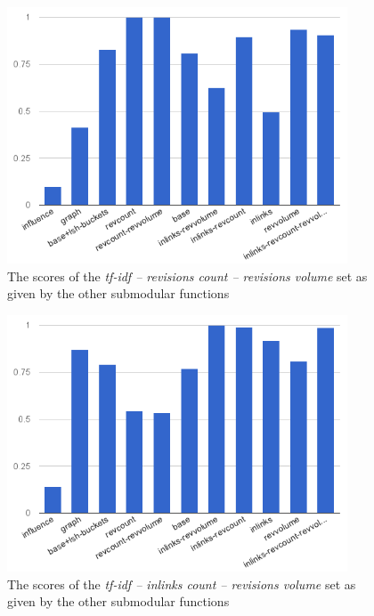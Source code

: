 \begin{figure}
  \centering
  \includegraphics[width=0.9\textwidth,natwidth=555,natheight=419]{images/rc-rv.png}
  \caption{The scores of the \emph{tf-idf -- revisions count -- revisions
  volume} set as given by the other submodular functions}
  \label{img:rc-rv}
\end{figure}

\begin{figure}
  \centering
  \includegraphics[width=0.9\textwidth,natwidth=555,natheight=419]{images/inl-rv.png}
  \caption{The scores of the \emph{tf-idf -- inlinks count -- revisions volume}
  set as given by the other submodular functions}
  \label{img:inl-rv}
\end{figure}


